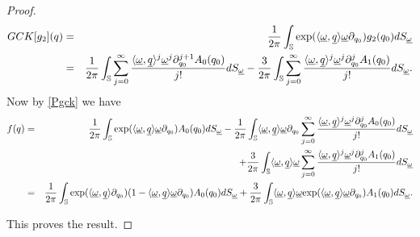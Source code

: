 \documentclass[reqno,11pt]{amsart}
\numberwithin{equation}{section}
\theoremstyle{definition}
\begin{document}
\begin{proof}
\begin{eqnarray*}
\label{g2}	
GCK[g_2](q)&=& \frac{1}{2 \pi} \int_{\mathbb{S}} \hbox{exp}( \langle \underline{\omega}, \underline{q} \rangle \underline{\omega} \partial_{q_0}) g_2(q_0) dS_{\underline{\omega}}\\
\nonumber
&=& \frac{1}{2 \pi} \int_{\mathbb{S}} \sum_{j=0}^\infty \frac{\langle \underline{\omega}, \underline{q} \rangle^j \underline{\omega}^j \partial_{q_0}^{j+1}A_0(q_0)}{j!}dS_{\underline{\omega}}-\frac{3}{2 \pi} \int_{\mathbb{S}} \sum_{j=0}^\infty \frac{\langle \underline{\omega}, \underline{q} \rangle^j \underline{\omega}^j \partial_{q_0}^j A_1(q_0)}{j!}dS_{\underline{\omega}}.
\end{eqnarray*}
Now by \eqref{Pgck} we have
\begin{eqnarray*}
f(q)&=& \frac{1}{2 \pi} \int_{\mathbb{S}} \hbox{exp}( \langle \underline{\omega}, \underline{q}\rangle \underline{\omega} \partial_{q_0})A_0(q_0)  dS_{\underline{\omega}}- \frac{1}{2 \pi} \int_{\mathbb{S}}  \langle \underline{\omega}, \underline{q} \rangle \underline{\omega} \partial_{q_0} \sum_{j=0}^\infty \frac{\langle \underline{\omega}, \underline{q}\rangle^j \underline{\omega}^j \partial_{q_0}^j A_0(q_0)}{j!} dS_{\underline{\omega}} \\
&&+\frac{3}{2 \pi} \int_{\mathbb{S}}\langle \underline{\omega}, \underline{q} \rangle \underline{\omega}  \sum_{j=0}^\infty \frac{\langle \underline{\omega}, \underline{q}\rangle^j \underline{\omega}^j \partial_{q_0}^j A_1(q_0)}{j!} dS_{\underline{\omega}}  \\
&=&\frac{1}{2 \pi}  \int_{\mathbb{S}} \hbox{exp}(\langle \underline{\omega}, \underline{q} \rangle \partial_{q_0})(1- \langle \underline{\omega}, \underline{q} \rangle \underline{\omega} \partial_{q_0})A_0(q_0) dS_{\underline{\omega}}+ \frac{3}{2 \pi} \int_{\mathbb{S}} \langle \underline{\omega}, \underline{q} \rangle \underline{\omega} \hbox{exp}(\langle \underline{\omega}, \underline{q} \rangle \underline{\omega} \partial_{q_0})A_1(q_0)dS_{\underline{\omega}} .
\end{eqnarray*}

This proves the result.







\end{proof}
\end{document}
